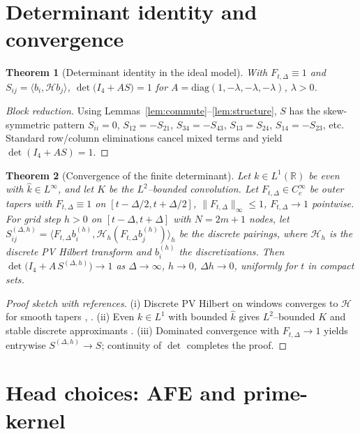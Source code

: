 \documentclass[11pt]{article}
\newtheorem{theorem}{Theorem}
\newcommand{\Hilb}{\mathcal H}
\begin{document}
{\section{Determinant identity and convergence}
\begin{theorem}[Determinant identity in the ideal model]\label{thm:det1}
With $F_{t,\Delta}\equiv 1$ and $S_{ij}=\langle b_i,\Hilb b_j\rangle$,
$\det\!\big(I_4 + A S\big)=1$ for $A=\mathrm{diag}(1,-\lambda,-\lambda,-\lambda)$, $\lambda>0$.
\end{theorem}

\begin{proof}[Block reduction]
Using Lemmas~\ref{lem:commute}--\ref{lem:structure}, $S$ has the skew-symmetric pattern
$S_{ii}=0$, $S_{12}=-S_{21}$, $S_{34}=-S_{43}$, $S_{13}=S_{24}$, $S_{14}=-S_{23}$, etc.
Standard row/column eliminations cancel mixed terms and yield $\det(I_4+AS)=1$.
\end{proof}

\begin{theorem}[Convergence of the finite determinant]\label{thm:convergence}
Let $k\in L^1(\mathbb{R})$ be even with $\widehat{k}\in L^\infty$, and let $K$ be the $L^2$--bounded convolution.
Let $F_{t,\Delta}\in C^\infty_c$ be outer tapers with $F_{t,\Delta}\equiv 1$ on $[t-\Delta/2,t+\Delta/2]$, $\|F_{t,\Delta}\|_\infty\le 1$,
$F_{t,\Delta}\to 1$ pointwise. For grid step $h>0$ on $[t-\Delta,t+\Delta]$ with $N=2m+1$ nodes, let
$S^{(\Delta,h)}_{ij}=\langle F_{t,\Delta}b_i^{(h)}, \Hilb_h(F_{t,\Delta}b_j^{(h)})\rangle_h$ be the discrete pairings,
where $\Hilb_h$ is the discrete PV Hilbert transform and $b_i^{(h)}$ the discretizations. Then
$\det\!\bigl(I_4 + A\,S^{(\Delta,h)}\bigr)\to 1$ as $\Delta\to\infty$, $h\to 0$, $\Delta h\to 0$, uniformly for $t$ in compact sets.
\end{theorem}

\begin{proof}[Proof sketch with references]
(i) Discrete PV Hilbert on windows converges to $\Hilb$ for smooth tapers \cite[Ch.~9]{king2009hilbert}, \cite{weideman1995hilbert}.
(ii) Even $k\in L^1$ with bounded $\widehat{k}$ gives $L^2$--bounded $K$ and stable discrete approximants \cite[Ch.~12]{kress2014integral}.
(iii) Dominated convergence with $F_{t,\Delta}\to 1$ yields entrywise $S^{(\Delta,h)}\to S$; continuity of $\det$ completes the proof.
\end{proof}

\section{Head choices: AFE and prime-kernel}
}
\end{document}
